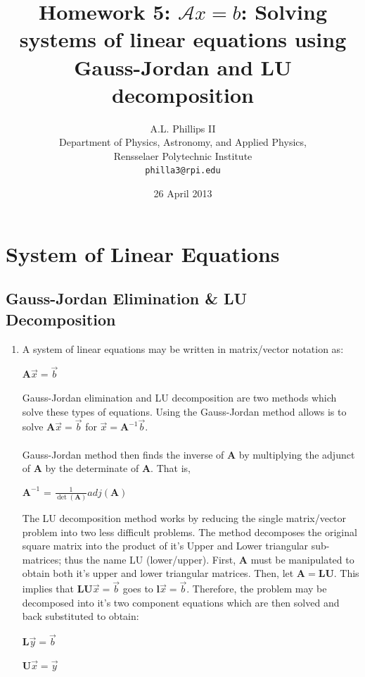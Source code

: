 \documentclass{report}
\begin{document}
\title{\textbf{Homework 5:} $\mathcal{A}x=b$: Solving systems of linear equations using Gauss-Jordan and LU decomposition}
\author{A.L. Phillips II\\
  Department of Physics, Astronomy, and Applied Physics,\\
  Rensselaer Polytechnic Institute\\
  \texttt{philla3@rpi.edu}}
 \date{26 April 2013}
 \renewcommand{\chaptername}{Assignment}
 \setcounter {chapter}{4}
\maketitle

\chapter{System of Linear Equations}

\section{Gauss-Jordan Elimination & LU Decomposition}
\begin{enumerate}

\item A system of linear equations may be written in matrix/vector notation as:
\begin{center}
$\displaystyle \mathbf{A}\vec{x}=\vec{b}$
\end{center} 
Gauss-Jordan elimination and LU decomposition are two methods which solve these types of equations. Using the Gauss-Jordan method allows  is to solve $\displaystyle \mathbf{A}\vec{x}=\vec{b}$ for $\displaystyle \vec{x}=\mathbf{A}^{-1}\vec{b}$. 
\\
\\Gauss-Jordan method then finds the inverse of $\mathbf{A}$ by multiplying the adjunct of $\mathbf{A}$ by the determinate of $\mathbf{A}$. That is, 
\begin{center}
$\displaystyle \mathbf{A}^{-1}$ = $\frac{1}{\det(\mathbf{A})}adj(\mathbf{A})$
\end{center} 

The LU decomposition method works by reducing the single matrix/vector problem into two less difficult problems. The method decomposes the original square matrix into the product of it's Upper and Lower triangular sub-matrices; thus the name LU (lower/upper). First, $\mathbf{A}$ must be manipulated to obtain both it's upper and lower triangular matrices. Then, let $\mathbf{A}=\mathbf{L}\mathbf{U}$. This implies that $\displaystyle \mathbf{L}\mathbf{U}\vec{x}=\vec{b}$ goes to $\displaystyle \mathbf{l}\vec{x}=\vec{b}$. Therefore, the problem may be decomposed into it's two component equations which are then solved and back substituted to obtain:
\begin{center}
$\displaystyle \mathbf{L}\vec{y} = \vec{b}$
\end{center} 
\begin{center}
$\displaystyle \mathbf{U}\vec{x} = \vec{y}$
\end{center} 
\end{enumerate}
\end{document}
